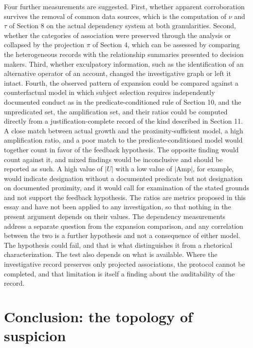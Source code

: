 \documentclass[11pt]{article}
\theoremstyle{definition}
\theoremstyle{remark}
\begin{document}
Four further measurements are suggested. First, whether apparent corroboration survives the removal of common data sources, which is the computation of $\nu$ and $\tau$ of Section 8 on the actual dependency system at both granularities. Second, whether the categories of association were preserved through the analysis or collapsed by the projection $\pi$ of Section 4, which can be assessed by comparing the heterogeneous records with the relationship summaries presented to decision makers. Third, whether exculpatory information, such as the identification of an alternative operator of an account, changed the investigative graph or left it intact. Fourth, the observed pattern of expansion could be compared against a counterfactual model in which subject selection requires independently documented conduct as in the predicate-conditioned rule of Section 10, and the unpredicated set, the amplification set, and their ratios could be computed directly from a justification-complete record of the kind described in Section 11. A close match between actual growth and the proximity-sufficient model, a high amplification ratio, and a poor match to the predicate-conditioned model would together count in favor of the feedback hypothesis. The opposite finding would count against it, and mixed findings would be inconclusive and should be reported as such. A high value of $|U|$ with a low value of $|\mathrm{Amp}|$, for example, would indicate designation without a documented predicate but not designation on documented proximity, and it would call for examination of the stated grounds and not support the feedback hypothesis. The ratios are metrics proposed in this essay and have not been applied to any investigation, so that nothing in the present argument depends on their values. The dependency measurements address a separate question from the expansion comparison, and any correlation between the two is a further hypothesis and not a consequence of either model. The hypothesis could fail, and that is what distinguishes it from a rhetorical characterization. The test also depends on what is available. Where the investigative record preserves only projected associations, the protocol cannot be completed, and that limitation is itself a finding about the auditability of the record.

\section{Conclusion: the topology of suspicion}
\end{document}
